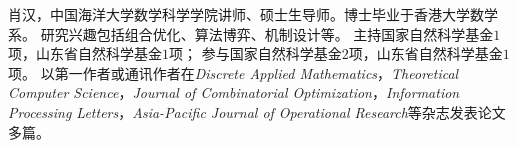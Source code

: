%
%

\par{
\fontsize{9.65pt}{\baselineskip}\selectfont
肖汉，中国海洋大学数学科学学院讲师、硕士生导师。博士毕业于香港大学数学系。
研究兴趣包括组合优化、算法博弈、机制设计等。
主持国家自然科学基金$1$项，山东省自然科学基金$1$项；
参与国家自然科学基金$2$项，山东省自然科学基金$1$项。
以第一作者或通讯作者在\emph{Discrete Applied Mathematics}，\emph{Theoretical Computer Science}，\emph{Journal of Combinatorial Optimization}，\emph{Information Processing Letters}，\emph{Asia-Pacific Journal of Operational Research}等杂志发表论文多篇。
}